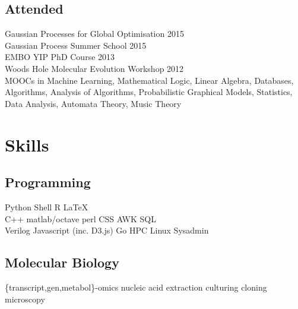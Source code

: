 \documentclass[]{Finlay_Maguire_CV}
\begin{document}
\begin{minipage}[t]{0.33\textwidth}
\subsection{Attended}
Gaussian Processes for Global Optimisation 2015\\
Gaussian Process Summer School 2015\\
EMBO YIP PhD Course 2013\\
Woods Hole Molecular Evolution Workshop 2012\\
MOOCs in Machine Learning, Mathematical Logic, Linear Algebra,
Databases, Algorithms, Analysis of Algorithms, 
Probabilistic Graphical Models, Statistics, Data Analysis,
Automata Theory, Music Theory\\ 
\sectionsep


\section{Skills}
\subsection{Programming}
Python \textbullet{}  Shell \textbullet{} R \textbullet{} \LaTeX\ \\ 
C++ \textbullet{} matlab/octave \textbullet{} perl \textbullet{} CSS \textbullet{} AWK \textbullet{} SQL  \\
Verilog \textbullet{} Javascript (inc. D3.js) \textbullet{} Go
\textbullet{} HPC Linux Sysadmin \\
\sectionsep
\subsection{Molecular Biology}
\{transcript,gen,metabol\}-omics \textbullet{} 
nucleic acid extraction \textbullet{} culturing \textbullet{}
cloning \textbullet{} microscopy \\
\sectionsep



%
%

\end{minipage} 
\hfill
\end{document}
